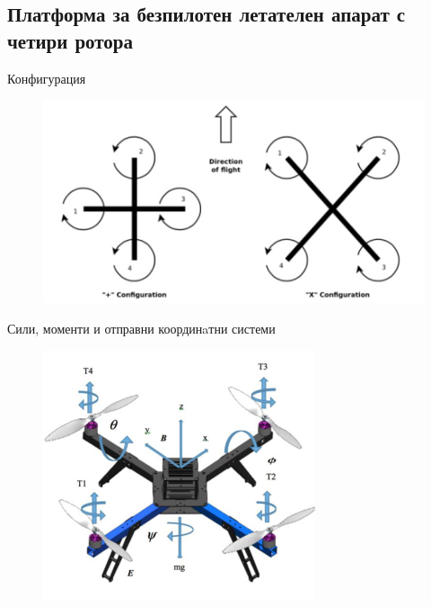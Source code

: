 \documentclass[handout]{beamer}
\begin{document}
\subsection{Платформа за безпилотен летателен апарат с четири ротора}


\begin{frame}{Конфигурация}
	\begin{figure}[!h]
		\centering
		\includegraphics[width=0.9\columnwidth]{Images/rotors.png}
	\end{figure}
\end{frame}

\begin{frame}{Сили, моменти и отправни координaтни системи}
\begin{figure}[!h]
    \centering
    \includegraphics[width=0.6\columnwidth]{Images/kinematika.png}

\end{figure}
\end{frame}
\end{document}
